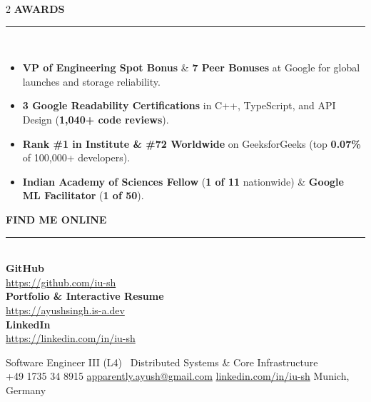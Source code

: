 \documentclass[letterpaper,10pt]{article}
\newcommand{\sidebarSection}[1]{%
  \vspace{7.5pt}%
  {\fontsize{9.8}{11.2}\selectfont\bfseries\color{white}\MakeUppercase{#1}}\\[-4pt]
  {\color{SidebarRule}\rule{\linewidth}{0.7pt}}\\[3.5pt]
}
\newcommand{\sItem}[1]{%
  \item {\fontsize{7.85}{9.4}\selectfont\color{SidebarMuted}#1}%
}
\begin{document}
\begin{paracol}{2}
\sidebarSection{AWARDS}
\begin{itemize}[label={\color{white}\tiny$\bullet$}, leftmargin=0.95em, itemsep=1.4pt]
  \sItem{\textbf{\color{white}VP of Engineering Spot Bonus} \& \textbf{\color{white}7 Peer Bonuses} at Google for global launches and storage reliability.}
  \sItem{\textbf{\color{white}3 Google Readability Certifications} in C++, TypeScript, and API Design (\textbf{\color{white}1,040+ code reviews}).}
  \sItem{\textbf{\color{white}Rank \#1 in Institute \& \#72 Worldwide} on GeeksforGeeks (top \textbf{\color{white}0.07\%} of 100,000+ developers).}
  \sItem{\textbf{\color{white}Indian Academy of Sciences Fellow} (\textbf{\color{white}1 of 11} nationwide) \& \textbf{\color{white}Google ML Facilitator} (\textbf{\color{white}1 of 50}).}
\end{itemize}

\sidebarSection{FIND ME ONLINE}
{\fontsize{8.0}{10.0}\selectfont\color{white}
  \faGithub\hspace{5pt}\textbf{GitHub}\\[0.5pt]
  {\fontsize{7.75}{9.2}\selectfont\color{SidebarMuted}\href{https://github.com/iu-sh}{https://github.com/iu-sh}}\\[4pt]
  \faGlobe\hspace{5pt}\textbf{Portfolio \& Interactive Resume}\\[0.5pt]
  {\fontsize{7.75}{9.2}\selectfont\color{SidebarMuted}\href{https://ayushsingh.is-a.dev}{https://ayushsingh.is-a.dev}}\\[4pt]
  \faLinkedin\hspace{5pt}\textbf{LinkedIn}\\[0.5pt]
  {\fontsize{7.75}{9.2}\selectfont\color{SidebarMuted}\href{https://linkedin.com/in/iu-sh}{https://linkedin.com/in/iu-sh}}
}

\switchcolumn

\vspace{1pt}
{\fontsize{11.2}{13.0}\selectfont\color{TealAccent}Software Engineer III (L4) \textperiodcentered\ Distributed Systems \& Core Infrastructure}\\[3pt]
{\fontsize{7.9}{9.5}\selectfont\color{RightBody}
  {\color{RightIcon}\faPhone*}\hspace{3.5pt}+49 1735 34 8915 \hspace{10pt}
  {\color{RightIcon}\faAt}\hspace{3.5pt}\href{mailto:apparently.ayush@gmail.com}{apparently.ayush@gmail.com} \hspace{10pt}
  {\color{RightIcon}\faLink}\hspace{3.5pt}\href{https://linkedin.com/in/iu-sh}{linkedin.com/in/iu-sh} \hspace{10pt}
  {\color{RightIcon}\faMapMarker*}\hspace{3.5pt}Munich, Germany
}
\vspace{1pt}


\end{paracol}
\end{document}
